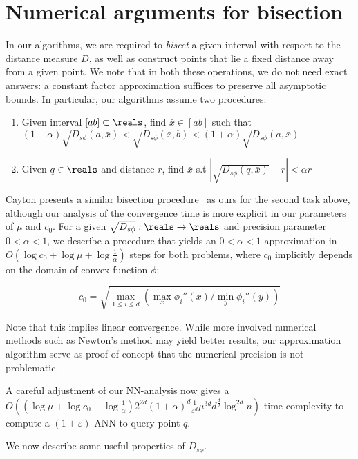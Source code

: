 \documentclass[11pt]{myclass}
\newcommand{\sbreg}{\ensuremath{D_{s\phi}}}
\newcommand{\eps}{\varepsilon}
\begin{document}
\section{Numerical arguments for bisection}\label{sec:numerical}
In our algorithms, we are required to \emph{bisect} a given interval with respect to the distance measure $D$, as well as construct points that lie a fixed distance away from a given point. We note that in both these operations, we do not need exact answers: a constant factor approximation suffices to preserve all asymptotic bounds.  
In particular, our algorithms assume two procedures: 
\begin{enumerate}
\item{Given interval $[ab] \subset \reals$, find $\bar{x} \in [ab]$ such that $(1 - \alpha)\sqrt{\sbreg(a,\bar{x})} < 
\sqrt{\sbreg(\bar{x}, b)} < (1 + \alpha) \sqrt{\sbreg(a,\bar{x})}$}

\item{ Given $q \in \reals$ and distance $r$, find $\bar{x}$ s.t $|\sqrt{\sbreg (q,\bar{x})} - r| < \alpha r$} 
\end{enumerate}

Cayton presents a similar bisection procedure~\cite{caytonpaper} as ours for the second task above, although our analysis of
the convergence time is more explicit in our parameters of $\mu$ and $c_0$. For a given $\sqrt{\sbreg} : \reals \to \reals$ and precision parameter $0 < \alpha < 1$, we describe a procedure that 
yields an $0 <\alpha < 1$ approximation in $O(\log c_0 + \log \mu + \log \frac{1}{\alpha})$ steps for both problems, where $c_0$ implicitly depends on the domain of convex function $\phi$:


\begin{equation}
c_0 =\sqrt{\max_{ 1 \leq i \leq d} \left(\max_x \phi_i'' (x)/  \min_y \phi_i''(y) \right)}
\end{equation}

Note that this implies linear convergence. While more involved numerical methods such as Newton's method may yield better results, 
our approximation algorithm serve as proof-of-concept that the numerical precision is not problematic. 

A careful adjustment of our NN-analysis now gives  
a $O\left( \left(\log \mu + \log c_0  + \log \frac{1}{\alpha} \right )2^{2d}  (1+ \alpha)^d \frac{1}{\eps^d} \mu^{3d} d^{\frac{d}{2}} \log^{2d} n \right)$ time complexity to compute a $(1 + \eps)$-ANN to query point $q$.


We now describe some useful properties of $\sbreg$.
\end{document}
